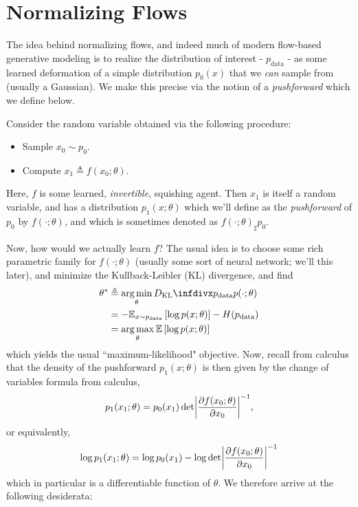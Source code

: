 \documentclass{scrartcl}
\begin{document}
\section{Normalizing Flows}
The idea behind normalizing flows, and indeed much of modern flow-based generative modeling is to realize the distribution of interest - $p_{\text{data}}$ - as some learned deformation of a simple distribution $p_0(x)$ that we \textit{can} sample from (usually a Gaussian). We make this precise via the notion of a \textit{pushforward} which we define below.
\begin{defbox}[Pushforward]
    Consider the random variable obtained via the following procedure:
    \begin{itemize}
        \item Sample $x_0 \sim p_0$.
        \item Compute $x_1 \triangleq f(x_0; \theta)$.
    \end{itemize}
    Here, $f$ is some learned, \textit{invertible}, squishing agent. Then $x_1$ is itself a random variable, and has a distribution $p_1(x;\theta)$ which we'll define as the \textit{pushforward} of $p_0$ by $f(\cdot;\theta)$, and which is sometimes denoted as $f(\cdot;\theta)_\sharp p_0$.
\end{defbox}
Now, how would we actually learn $f$? The usual idea is to choose some rich parametric family for $f(\cdot; \theta)$ (usually some sort of neural network; we'll this later), and minimize the Kullback-Leibler (KL) divergence, and find
\begin{align*}
\theta^\ast&\triangleq \argmin_\theta \dkl{\pdata}{p(\cdot; \theta)}\\
&= -\EE_{x \sim \pdata} \left[\log p(x; \theta)\right] - H(\pdata)\\
&= \argmax_{\theta} \EE \left[\log p(x; \theta)\right]
\end{align*}
which yields the usual ``maximum-likelihood" objective. Now, recall from calculus that the density of the pushforward $p_1(x; \theta)$ is then given by the change of variables formula from calculus,
\begin{equation}
p_1(x_1; \theta) = p_0(x_1)\det\abs*{\pdv{f(x_0;\theta)}{x_0}}^{-1},
\end{equation}
or equivalently,
\begin{equation}
    \log p_1(x_1; \theta) = \log p_0(x_1) - \log \det\abs*{\pdv{f(x_0;\theta)}{x_0}}^{-1}
    \label{eq:cov}
\end{equation}
which in particular is a differentiable function of $\theta$. We therefore arrive at the following desiderata:
\end{document}
